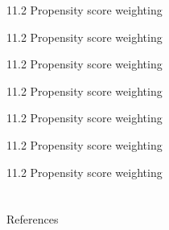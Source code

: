 \documentclass[aspectratio=169, 12pt]{beamer}
\begin{document}
\begin{frame}{11.2 Propensity score weighting}
  
\end{frame}

\begin{frame}{11.2 Propensity score weighting}
  
\end{frame}

\begin{frame}{11.2 Propensity score weighting}
  
\end{frame}

\begin{frame}{11.2 Propensity score weighting}
  
\end{frame}

\begin{frame}{11.2 Propensity score weighting}
  
\end{frame}

\begin{frame}{11.2 Propensity score weighting}
  
\end{frame}

\begin{frame}{11.2 Propensity score weighting}
  
\end{frame}



\section{}
\begin{frame}{References}
  \beamerdefaultoverlayspecification{}
  \small
  
\end{frame}
\end{document}

